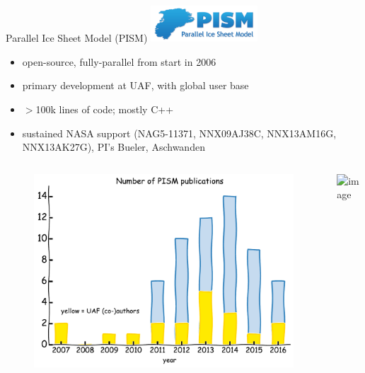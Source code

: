 \documentclass[hide notes,intlimits]{beamer}
\begin{document}
\begin{frame}{Parallel Ice Sheet Model (PISM)}
  \includegraphics[width=4cm]{pism-logo}
  \begin{itemize}
  \item open-source, fully-parallel from start in 2006
  \item primary development at UAF, with global user base
  \item $>$100k lines of code; mostly C++
  \item sustained NASA support \tiny (NAG5-11371, NNX09AJ38C, NNX13AM16G, NNX13AK27G), PI's Bueler, Aschwanden
  \end{itemize}
  \begin{columns}
    \column[c]{4.75cm}
    \begin{figure}
      \includegraphics[width=\textwidth]{pism-uaf-publications}
    \end{figure}
    \column[c]{6.25cm}
    \includegraphics<1>[width=\textwidth]{pism-users}
  \end{columns}
\end{frame}
\end{document}
